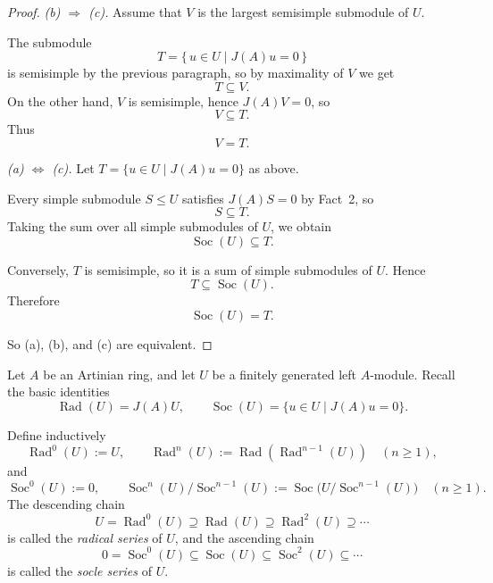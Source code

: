 \begin{proof}
    \medskip

    \noindent
    \textit{\textup{(b)} $\Rightarrow$ \textup{(c)}.}
    Assume that $V$ is the largest semisimple submodule of $U$.

    The submodule
    \[
        T=\{\,u\in U\mid J(A)u=0\,\}
    \]
    is semisimple by the previous paragraph, so by maximality of $V$ we get
    \[
        T\subseteq V.
    \]
    On the other hand, $V$ is semisimple, hence $J(A)V=0$, so
    \[
        V\subseteq T.
    \]
    Thus
    \[
        V=T.
    \]

    \medskip

    \noindent
    \textit{\textup{(a)} $\Leftrightarrow$ \textup{(c)}.}
    Let $T=\{u\in U\mid J(A)u=0\}$ as above.

    Every simple submodule $S\leq U$ satisfies $J(A)S=0$ by Fact~2, so
    \[
        S\subseteq T.
    \]
    Taking the sum over all simple submodules of $U$, we obtain
    \[
        \operatorname{Soc}(U)\subseteq T.
    \]

    Conversely, $T$ is semisimple, so it is a sum of simple submodules of $U$. Hence
    \[
        T\subseteq \operatorname{Soc}(U).
    \]
    Therefore
    \[
        \operatorname{Soc}(U)=T.
    \]

    So \textup{(a)}, \textup{(b)}, and \textup{(c)} are equivalent.
\end{proof}

Let $A$ be an Artinian ring, and let $U$ be a finitely generated left $A$-module.
Recall the basic identities
\[
    \operatorname{Rad}(U)=J(A)U,
    \qquad
    \operatorname{Soc}(U)=\{u\in U\mid J(A)u=0\}.
\]

\begin{definition}
    Define inductively
    \[
        \operatorname{Rad}^0(U):=U,\qquad \operatorname{Rad}^n(U):=\operatorname{Rad}(\operatorname{Rad}^{n-1}(U))\quad (n\ge 1),
    \]
    and
    \[
        \operatorname{Soc}^0(U):=0,\qquad
        \operatorname{Soc}^n(U)/\operatorname{Soc}^{n-1}(U):=\operatorname{Soc}\bigl(U/\operatorname{Soc}^{n-1}(U)\bigr)\quad (n\ge 1).
    \]
    The descending chain
    \[
        U=\operatorname{Rad}^0(U)\supseteq \operatorname{Rad}(U)\supseteq \operatorname{Rad}^2(U)\supseteq \cdots
    \]
    is called the \emph{radical series} of $U$, and the ascending chain
    \[
        0=\operatorname{Soc}^0(U)\subseteq \operatorname{Soc}(U)\subseteq \operatorname{Soc}^2(U)\subseteq \cdots
    \]
    is called the \emph{socle series} of $U$.
\end{definition}

